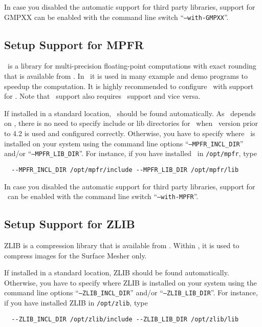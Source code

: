 In case you disabled the automatic support for third party libraries,
support for GMPXX can be enabled with the command line switch
``\texttt{--with-GMPXX}''.

\subsection{Setup Support for MPFR\label{sec:mpfr-setup}}

\mpfr\ is a library for multi-precision floating-point computations
with exact rounding that is available from \mpfrpage. In \cgal\ it is
used in many example and demo programs to speedup the computation. It
is highly recommended to configure \cgal\ with support for \mpfr. Note
that \mpfr\ support also requires \gmp\ support and vice versa.

If installed in a standard location, \mpfr\ should be found
automatically. As \mpfr\ depends on \gmp, there is no need to specify
include or lib directories for \mpfr\ when \gmp\ version prior to 4.2
is used and configured correctly. Otherwise, you have to specify where
\mpfr\ is installed on your system using the command line options
``\texttt{--MPFR\_INCL\_DIR}'' and/or ``\texttt{--MPFR\_LIB\_DIR}''.
For instance, if you have installed \mpfr\ in \texttt{/opt/mpfr}, type
\begin{verbatim}
  --MPFR_INCL_DIR /opt/mpfr/include --MPFR_LIB_DIR /opt/mpfr/lib
\end{verbatim}

In case you disabled the automatic support for third party libraries,
support for \mpfr\ can be enabled with the command line switch
``\texttt{--with-MPFR}''.

\subsection{Setup Support for ZLIB\label{sec:zlib-setup}}

ZLIB is a compression library that is available from \zlibpage.
Within \cgal, it is used to compress images for the Surface Mesher
only.

If installed in a standard location, ZLIB should be found
automatically.  Otherwise, you have to specify where ZLIB is installed
on your system using the command line options
``\texttt{--ZLIB\_INCL\_DIR}'' and/or ``\texttt{--ZLIB\_LIB\_DIR}''.
For instance, if you have installed ZLIB in \texttt{/opt/zlib}, type
\begin{verbatim}
  --ZLIB_INCL_DIR /opt/zlib/include --ZLIB_LIB_DIR /opt/zlib/lib
\end{verbatim}

